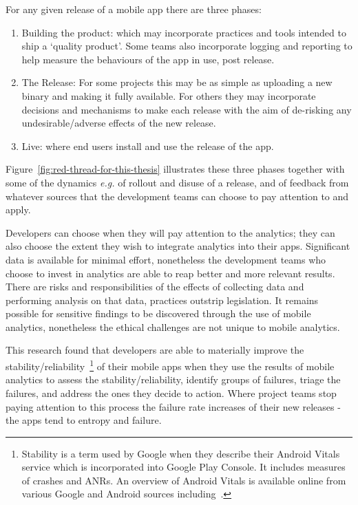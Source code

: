 For any given release of a mobile app there are three phases:
\begin{enumerate}
    \item Building the product: which may incorporate practices and tools intended to ship a `quality product'. Some teams also incorporate logging and reporting to help measure the behaviours of the app in use, post release.
    \item The Release: For some projects this may be as simple as uploading a new binary and making it fully available. For others they may incorporate decisions and mechanisms to make each release with the aim of de-risking any undesirable/adverse effects of the new release.
    \item Live: where end users install and use the release of the app.
\end{enumerate}

Figure~\ref{fig:red-thread-for-this-thesis} illustrates these three phases together with some of the dynamics \emph{e.g.} of rollout and disuse of a release, and of feedback from whatever sources that the development teams can choose to pay attention to and apply.

Developers can choose when they will pay attention to the analytics; they can also choose the extent they wish to integrate analytics into their apps. Significant data is available for minimal effort, nonetheless the development teams who choose to invest in analytics are able to reap better and more relevant results. There are risks and responsibilities of the effects of collecting data and performing analysis on that data, practices outstrip legislation. It remains possible for sensitive findings to be discovered through the use of mobile analytics, nonetheless the ethical challenges are not unique to mobile analytics.

This research found that developers are able to materially improve the stability/reliability~\footnote{Stability is a term used by Google when they describe their Android Vitals service which is incorporated into Google Play Console. It includes measures of crashes and ANRs. An overview of Android Vitals is available online from various Google and Android sources including~\citep{android_vitals_overview_2019, android_vitals_best_practices}.}
%
of their mobile apps when they use the results of mobile analytics to assess the stability/reliability, identify groups of failures, triage the failures, and address the ones they decide to action. Where project teams stop paying attention to this process the failure rate increases of their new releases - the apps tend to entropy and failure.

